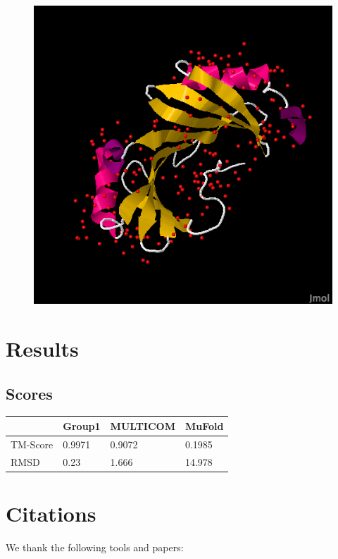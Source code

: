 \documentclass{article}
\begin{document}
\begin{figure}
\begin{minipage}{.5\textwidth}
  \includegraphics[width=.9\linewidth]{target_native}
  \label{fig:test2}
\end{minipage}
\end{figure}

\section{Results}



\subsection{Scores}
\begin{center}
    \begin{tabular}{ | l | l | l | p{2cm} |}
    \hline
      & Group1 & MULTICOM & MuFold \\ \hline
    TM-Score & 0.9971 & 0.9072 & 0.1985 \\ \hline
    RMSD & 0.23 & 1.666 & 14.978 \\
    \hline
    \end{tabular}
\end{center}

\section{Citations}

We thank the following tools and papers: \\\\
\end{document}
